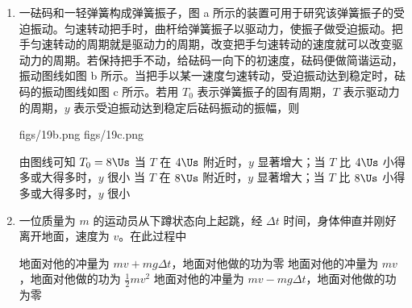 \documentclass[\gkver]{gaokaozhenti}
\begin{document}
\begin{enumerate}
\item
一砝码和一轻弹簧构成弹簧振子，图 a 所示的装置可用于研究该弹簧振子的受迫振动。匀速转动把手时，曲杆给弹簧振子以驱动力，使振子做受迫振动。把手匀速转动的周期就是驱动力的周期，改变把手匀速转动的速度就可以改变驱动力的周期。若保持把手不动，给砝码一向下的初速度，砝码便做简谐运动，振动图线如图 b 所示。当把手以某一速度匀速转动，受迫振动达到稳定时，砝码的振动图线如图 c 所示。若用 $T_{0}$ 表示弹簧振子的固有周期，$T$ 表示驱动力的周期，$y$ 表示受迫振动达到稳定后砝码振动的振幅，则

{figs/19b.png}
{figs/19c.png}

{由图线可知 $T_{0}=8\Us$}
{当 $T$ 在 $4\Us$ 附近时，$y$ 显著增大；当 $T$ 比 $4\Us$ 小得多或大得多时，$y$ 很小}
{当 $T$ 在 $8\Us$ 附近时，$y$ 显著增大；当 $T$ 比 $8\Us$ 小得多或大得多时，$y$ 很小}


\item
一位质量为 $m$ 的运动员从下蹲状态向上起跳，经 $\Delta t$ 时间，身体伸直并刚好离开地面，速度为 $v$。在此过程中

{地面对他的冲量为 $mv+mg\Delta t$，地面对他做的功为零}
{地面对他的冲量为 $mv$，地面对他做的功为 $\frac{1}{2}mv^{2}$}
{地面对他的冲量为 $mv-mg\Delta t$，地面对他做的功为零}



\end{enumerate}
\end{document}
